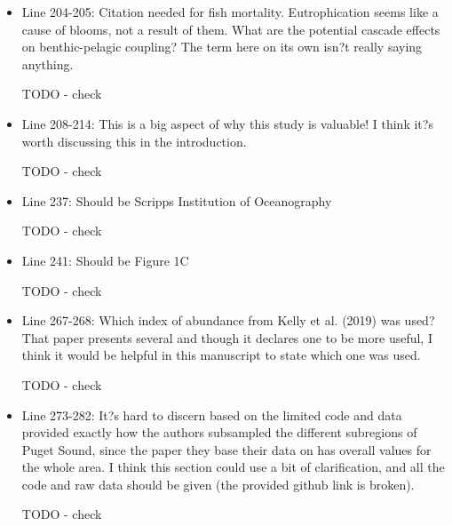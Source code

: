 \documentclass[11pt]{article}
\begin{document}
\begin{linenumbers}
\begin{itemize}
\item{Line 204-205: Citation needed for fish mortality. Eutrophication seems like a cause of blooms, not a result of them. What are the potential cascade effects on benthic-pelagic coupling? The term here on its own isn?t really saying anything.}

{\color{red} TODO - check }


\item{Line 208-214: This is a big aspect of why this study is valuable! I think it?s worth discussing this in the introduction.}

{\color{red} TODO - check }


\item{Line 237: Should be Scripps Institution of Oceanography}

{\color{red} TODO - check }


\item{Line 241: Should be Figure 1C}

{\color{red} TODO - check }


\item{Line 267-268: Which index of abundance from Kelly et al. (2019) was used? That paper presents several and though it declares one to be more useful, I think it would be helpful in this manuscript to state which one was used.}

{\color{red} TODO - check }


\item{Line 273-282: It?s hard to discern based on the limited code and data provided exactly how the authors subsampled the different subregions of Puget Sound, since the paper they base their data on has overall values for the whole area. I think this section could use a bit of clarification, and all the code and raw data should be given (the provided github link is broken).}

{\color{red} TODO - check }


\end{itemize}
 \end{linenumbers}
\end{document}
